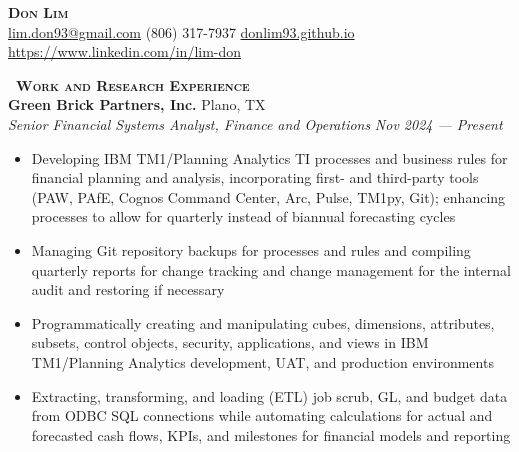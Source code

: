 \documentclass[a4paper,11pt]{article}
\newcommand{\header} [1] {
    \vspace{0.5mm}
    {\textsc{\textbf{\large{\xrfill[0.5ex]{0.5pt}~#1~\xrfill[0.5ex]{0.5pt}}}}} %
}
\begin{document}
\vspace*{-0.45in}
\fontsize{10.5}{11.5}\selectfont

\begin{center}
    {\Huge\textbf\textsc{{{Don Lim}}}}\\ \vspace{0.5mm}
    \href{mailto:lim.don93@gmail.com}{lim.don93@gmail.com}  (806) 317-7937  \href{https://donlim93.github.io/}{donlim93.github.io}  \href{https://www.linkedin.com/in/lim-don/}{https://www.linkedin.com/in/lim-don} \\
\end{center}
\vspace*{-2mm}

\header{Work and Research Experience} \\
\vspace{0.5mm}
\textbf{Green Brick Partners, Inc.} \hfill Plano, TX \\
\textit{Senior Financial Systems Analyst, Finance and Operations} \hfill \textit{Nov 2024 --- Present} \\
\begin{itemize}
    \item Developing IBM TM1/Planning Analytics TI processes and business rules for financial planning and analysis, incorporating first- and third-party tools (PAW, PAfE, Cognos Command Center, Arc, Pulse, TM1py, Git); enhancing processes to allow for quarterly instead of biannual forecasting cycles
    \item Managing Git repository backups for processes and rules and compiling quarterly reports for change tracking and change management for the internal audit and restoring if necessary
    \item Programmatically creating and manipulating cubes, dimensions, attributes, subsets, control objects, security, applications, and views in IBM TM1/Planning Analytics development, UAT, and production environments
    \item Extracting, transforming, and loading (ETL) job scrub, GL, and budget data from ODBC SQL connections while automating calculations for actual and forecasted cash flows, KPIs, and milestones for financial models and reporting 
\end{itemize}
\vspace{0.5mm}
\end{document}
